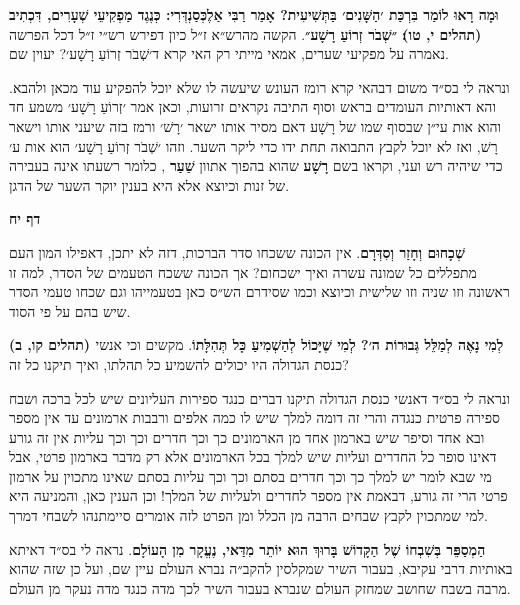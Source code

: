 \documentclass[12pt, openany]{book}
\newcommand{\sethebfont}{
\fontsize{10.5pt}{13.1pt} \selectfont
}
\newcommand{\textblock}[1]{
{\sethebfont #1\\}	
}
\newcommand{\sectname}{}
\newcommand{\newsection}[1]{
	\renewcommand{\sectname}{#1}	
	\vspace{-\baselineskip}
	\begin{center}
		\textbf{%
\fontsize{16pt}{16pt}\selectfont
			#1}
	\end{center}
	\vspace{-\baselineskip}
	\nopagebreak
}
\begin{document}
\textblock{\textbf{וּמָה רָאוּ לוֹמַר בִּרְכַּת ׳הַשָּׁנִים׳ בַּתְּשִׁיעִית? אָמַר רַבִּי אַלֶכְּסַנְדְּרִי: כְּנֶגֶד מַפְקִיעֵי שְׁעָרִים, דִּכְתִיב {\small (תהלים י, טו)}׃ ״שְׁבֹר זְרוֹעַ רָשָׁע״}. הקשה מהרש״א ז״ל כיון דפירש רש״י ז״ל דכל הפרשה נאמרה על מפקיעי שערים, אמאי מייתי רק האי קרא ד׳שְׁבֹר זְרוֹעַ רָשָׁע׳? יעוין שם.\par ונראה לי בס״ד משום דבהאי קרא רומז העונש שיעשה לו שלא יוכל להפקיע עוד מכאן ולהבא. והא דאותיות העומדים בראש וסוף התיבה נקראים זרועות, וכאן אמר ׳זְרוֹעַ רָשָׁע׳ משמע חד והוא אות עי״ן שבסוף שמו של רָשָׁע דאם מסיר אותו ישאר ׳רָשׁ׳ ורמז בזה שיעני אותו וישאר רָשׁ, ואז לא יוכל לקבץ התבואה תחת ידו כדי ליקר השער. וזהו ׳שְׁבֹר זְרוֹעַ רָשָׁע׳ הוא אות ע׳ כדי שיהיה רש ועני, וקראו בשם \textbf{רָשָׁע} שהוא בהפוך אתוון \textbf{שַׁעַר} , כלומר רשעתו אינה בעבירה של זנות וכיוצא אלא היא בענין יוקר השער של הדגן.}
\clearpage
\newsection{דף יח}
\textblock{\textbf{שְׁכָחוּם וְחָזַר וְסִדְּרָם}. אין הכונה ששכחו סדר הברכות, דזה לא יתכן, דאפילו המון העם מתפללים כל שמונה עשרה ואיך ישכחום? אך הכונה ששכח הטעמים של הסדר, למה זו ראשונה וזו שניה וזו שלישית וכיוצא וכמו שסידרם הש״ס כאן בטעמייהו וגם שכחו טעמי הסדר שיש בהם על פי הסוד.}
\textblock{\textbf{{\small (תהלים קו, ב)} לְמִי נָאֶה לְמַלֵּל גְּבוּרוֹת ה׳? לְמִי שֶׁיָּכוֹל לְהַשְׁמִיעַ כָּל תְּהִלָּתוֹ}. מקשים וכי אנשי כנסת הגדולה היו יכולים להשמיע כל תהלתו, ואיך תיקנו כל זה?\par ונראה לי בס״ד דאנשי כנסת הגדולה תיקנו דברים כנגד ספירות העליונים שיש לכל ברכה ושבח ספירה פרטית כנגדה והרי זה דומה למלך שיש לו כמה אלפים ורבבות ארמונים עד אין מספר ובא אחד וסיפר שיש בארמון אחד מן הארמונים כך וכך חדרים וכך וכך עליות אין זה גורע דאינו סופר כל החדרים ועליות שיש למלך בכל הארמונים אלא רק מדבר בארמון פרטי, אבל מי שבא לומר יש למלך כך וכך חדרים בסתם וכך וכך עליות בסתם שאינו מתכוין על ארמון פרטי הרי זה גורע, דבאמת אין מספר לחדרים ולעליות של המלך! וכן הענין כאן, והמניעה היא למי שמתכוין לקבץ שבחים הרבה מן הכלל ומן הפרט לזה אומרים סיימתנהו לשבחי דמרך.}
\textblock{\textbf{הַמְסַפֵּר בְּשִׁבְחוֹ שֶׁל הַקָּדוֹשׁ בָּרוּךְ הוּא יוֹתֵר מִדַּאי, נֶעֱקָר מִן הָעוֹלָם}. נראה לי בס״ד דאיתא באותיות דרבי עקיבא, בעבור השיר שמקלסין להקב״ה נברא העולם עיין שם, ועל כן שזה שהוא מרבה בשבח שחושב שמחזק העולם שנברא בעבור השיר לכך מדה כנגד מדה נעקר מן העולם.}
\end{document}
